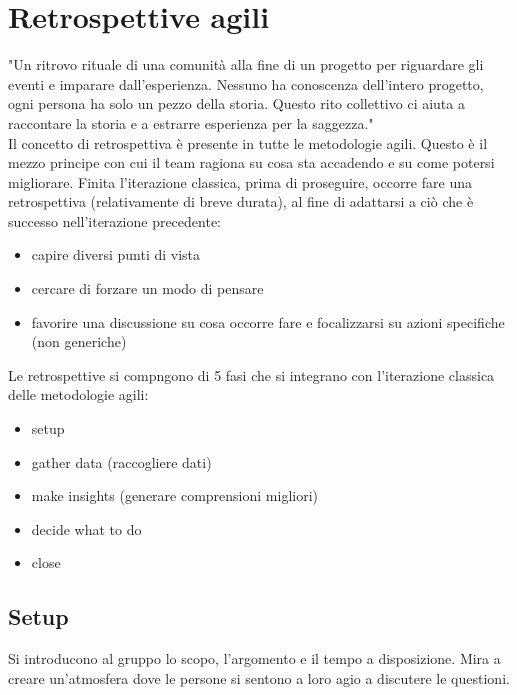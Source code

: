 \section{Retrospettive agili}

"Un ritrovo rituale di una comunità alla fine di un progetto per riguardare gli eventi e imparare dall'esperienza. Nessuno ha conoscenza dell'intero progetto, ogni persona ha solo un pezzo della storia. Questo rito collettivo ci aiuta a raccontare la storia e a estrarre esperienza per la saggezza."\\

\noindent Il concetto di retrospettiva è presente in tutte le metodologie agili. Questo è il mezzo principe con cui il team ragiona su cosa sta accadendo e su come potersi migliorare. Finita l'iterazione classica, prima di proseguire, occorre fare una retrospettiva (relativamente di breve durata), al fine di adattarsi a ciò che è successo nell'iterazione precedente:

\begin{itemize}
    \item capire diversi punti di vista
    \item cercare di forzare un modo di pensare
    \item favorire una discussione su cosa occorre fare e focalizzarsi su azioni specifiche (non generiche)
\end{itemize}

\noindent Le retrospettive si compngono di 5 fasi che si integrano con l'iterazione classica delle metodologie agili:

\begin{itemize}
    \item setup
    \item gather data (raccogliere dati)
    \item make insights (generare comprensioni migliori)
    \item decide what to do
    \item close
\end{itemize}

\subsection{Setup}

Si introducono al gruppo lo scopo, l'argomento e il tempo a disposizione. Mira a creare un'atmosfera dove le persone si sentono a loro agio a discutere le questioni.\\

